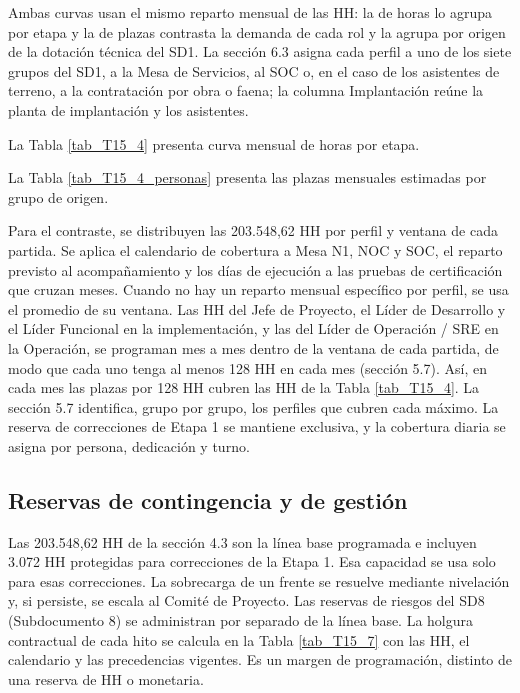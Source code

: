 Ambas curvas usan el mismo reparto mensual de las HH: la de horas lo agrupa por etapa y la de plazas contrasta la demanda de cada rol y la agrupa por origen de la dotación técnica del SD1. La sección 6.3 asigna cada perfil a uno de los siete grupos del SD1, a la Mesa de Servicios, al SOC o, en el caso de los asistentes de terreno, a la contratación por obra o faena; la columna Implantación reúne la planta de implantación y los asistentes.

La Tabla \ref{tab_T15_4} presenta curva mensual de horas por etapa.

La Tabla \ref{tab_T15_4_personas} presenta las plazas mensuales estimadas por grupo de origen.


Para el contraste, se distribuyen las 203.548,62 HH por perfil y ventana de cada partida. Se aplica el calendario de cobertura a Mesa N1, NOC y SOC, el reparto previsto al acompañamiento y los días de ejecución a las pruebas de certificación que cruzan meses. Cuando no hay un reparto mensual específico por perfil, se usa el promedio de su ventana. Las HH del Jefe de Proyecto, el Líder de Desarrollo y el Líder Funcional en la implementación, y las del Líder de Operación / SRE en la Operación, se programan mes a mes dentro de la ventana de cada partida, de modo que cada uno tenga al menos 128 HH en cada mes (sección 5.7). Así, en cada mes las plazas por 128 HH cubren las HH de la Tabla \ref{tab_T15_4}. La sección 5.7 identifica, grupo por grupo, los perfiles que cubren cada máximo. La reserva de correcciones de Etapa 1 se mantiene exclusiva, y la cobertura diaria se asigna por persona, dedicación y turno.

\subsection{Reservas de contingencia y de gestión}

Las 203.548,62 HH de la sección 4.3 son la línea base programada e incluyen 3.072 HH protegidas para correcciones de la Etapa 1. Esa capacidad se usa solo para esas correcciones. La sobrecarga de un frente se resuelve mediante nivelación y, si persiste, se escala al Comité de Proyecto. Las reservas de riesgos del SD8 (Subdocumento 8) se administran por separado de la línea base. La holgura contractual de cada hito se calcula en la Tabla \ref{tab_T15_7} con las HH, el calendario y las precedencias vigentes. Es un margen de programación, distinto de una reserva de HH o monetaria.


